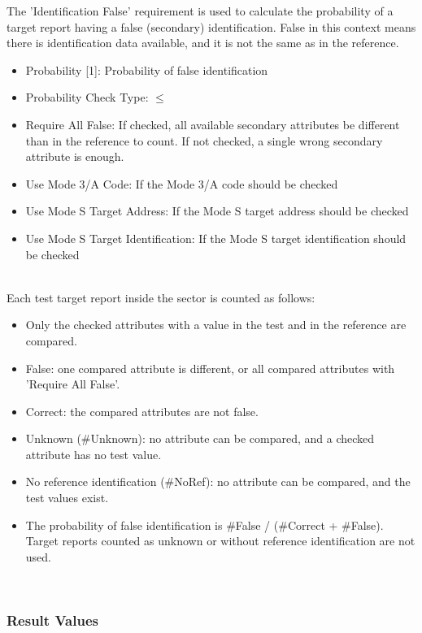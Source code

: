 The 'Identification False' requirement is used to calculate the probability of a target report having a false (secondary) identification. False in this context means there is identification data available, and it is not the same as in the reference. \\

\begin{itemize}  
\item Probability [1]: Probability of false identification
\item Probability Check Type: $\leq$
\item Require All False: If checked, all available secondary attributes be different than in the reference to count. If not checked, a single wrong secondary attribute is enough.
\item Use Mode 3/A Code: If the Mode 3/A code should be checked
\item Use Mode S Target Address: If the Mode S target address should be checked
\item Use Mode S Target Identification: If the Mode S target identification should be checked
\end{itemize}
\ \\

Each test target report inside the sector is counted as follows:
\begin{itemize}
\item Only the checked attributes with a value in the test and in the reference are compared.
\item False: one compared attribute is different, or all compared attributes with 'Require All False'.
\item Correct: the compared attributes are not false.
\item Unknown (\#Unknown): no attribute can be compared, and a checked attribute has no test value.
\item No reference identification (\#NoRef): no attribute can be compared, and the test values exist.
\item The probability of false identification is \#False / (\#Correct + \#False). Target reports counted as unknown or without reference identification are not used.
\end{itemize}
\ \\

\subsubsection{Result Values}

